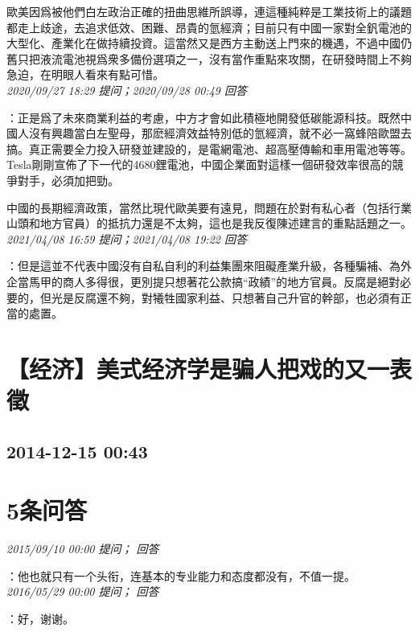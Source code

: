 \documentclass[twocolumn]{ctexart}
\begin{document}
歐美因爲被他們白左政治正確的扭曲思維所誤導，連這種純粹是工業技術上的議題都走上歧途，去追求低效、困難、昂貴的氫經濟；目前只有中國一家對全釩電池的大型化、產業化在做持續投資。這當然又是西方主動送上門來的機遇，不過中國仍舊只把液流電池視爲衆多備份選項之一，沒有當作重點來攻關，在研發時間上不夠急迫，在明眼人看來有點可惜。
\\

\textit{\hfill\noindent\small 2020/09/27 18:29 提问；2020/09/28 00:49 回答}

：正是爲了未來商業利益的考慮，中方才會如此積極地開發低碳能源科技。既然中國人沒有興趣當白左聖母，那麽經濟效益特別低的氫經濟，就不必一窩蜂陪歐盟去搞。真正需要全力投入研發並建設的，是電網電池、超高壓傳輸和車用電池等等。Tesla剛剛宣佈了下一代的4680鋰電池，中國企業面對這樣一個研發效率很高的競爭對手，必須加把勁。

中國的長期經濟政策，當然比現代歐美要有遠見，問題在於對有私心者（包括行業山頭和地方官員）的抵抗力還是不太夠，這也是我反復陳述建言的重點話題之一。
\\

\textit{\hfill\noindent\small 2021/04/08 16:59 提问；2021/04/08 19:22 回答}

：但是這並不代表中國沒有自私自利的利益集團來阻礙產業升級，各種騙補、為外企當馬甲的商人多得很，更別提只想著花公款搞“政績”的地方官員。反腐是絕對必要的，但光是反腐還不夠，對犧牲國家利益、只想著自己升官的幹部，也必須有正當的處置。
\\


\section{【经济】美式经济学是骗人把戏的又一表徵}
\subsection{2014-12-15 00:43}


\section{5条问答}

\textit{\hfill\noindent\small 2015/09/10 00:00 提问； 回答}

：他也就只有一个头衔，连基本的专业能力和态度都没有，不值一提。\\

\textit{\hfill\noindent\small 2016/05/29 00:00 提问； 回答}

：好，谢谢。\\
\end{document}
